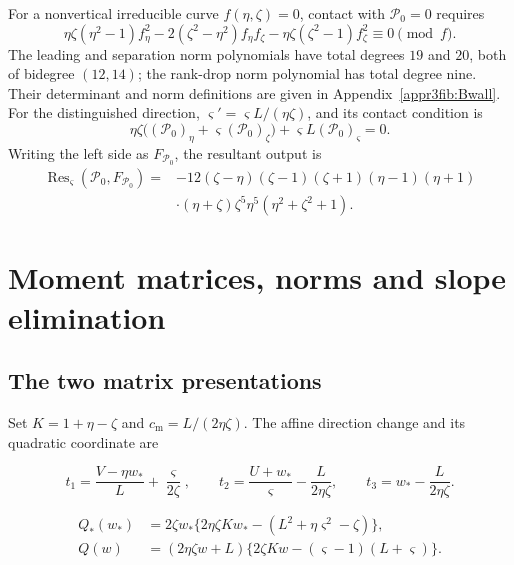 For a nonvertical irreducible curve $f(\eta,\zeta)=0$, contact with
$\mathcal P_0=0$ requires
\[
 \eta\zeta(\eta^2-1)f_\eta^2
 -2(\zeta^2-\eta^2)f_\eta f_\zeta
 -\eta\zeta(\zeta^2-1)f_\zeta^2\equiv0\pmod f.
\]
The leading and separation norm polynomials have total degrees $19$
and $20$, both of bidegree $(12,14)$; the rank-drop norm polynomial
has total degree nine. Their determinant and norm definitions are
given in Appendix~\ref{appr3fib:Bwall}.
For the distinguished direction,
$\varsigma'=\varsigma L/(\eta\zeta)$, and its contact condition is
\[
 \eta\zeta\bigl((\mathcal P_0)_\eta+
   \varsigma(\mathcal P_0)_\zeta\bigr)
   +\varsigma L(\mathcal P_0)_\varsigma=0.
\]
Writing the left side as $F_{\mathcal P_0}$, the resultant output is
\[
\begin{aligned}
 \operatorname{Res}_\varsigma(\mathcal P_0,F_{\mathcal P_0})
 ={}&-12(\zeta-\eta)(\zeta-1)(\zeta+1)(\eta-1)(\eta+1)\\
 &\cdot(\eta+\zeta)\zeta^5\eta^5(\eta^2+\zeta^2+1).
\end{aligned}
\]

\clearpage
\section{Moment matrices, norms and slope elimination}\label{supp:elimination}

\subsection{The two matrix presentations}

Set $K=1+\eta-\zeta$ and $c_{\mathrm m}=L/(2\eta\zeta)$.
The affine direction change and its quadratic coordinate are

\begin{equation}\label{supp:r3:momentcoordinates}
 t_1=\frac{V-\eta w_*}{L}+\frac{\varsigma }{2\zeta },\qquad
 t_2=\frac{U+w_*}{\varsigma }-\frac{L}{2\eta \zeta },\qquad
 t_3=w_*-\frac{L}{2\eta \zeta }.
\end{equation}

\begin{equation}\label{supp:r3:momentquadratics}
\begin{aligned}
 Q_*(w_*)&=2\zeta w_*\{2\eta \zeta Kw_*-(L^2+\eta \varsigma ^2-\zeta )\},\\
 Q(w)&=(2\eta \zeta w+L)\{2\zeta Kw-(\varsigma -1)(L+\varsigma )\}.
\end{aligned}
\end{equation}

